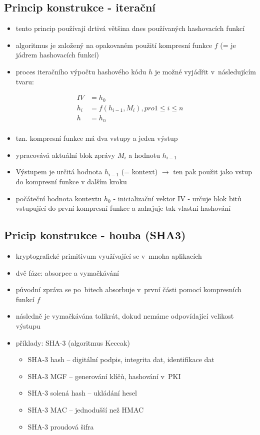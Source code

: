 \subsection{Princip konstrukce - iterační}
\begin{itemize}
    \item tento princip používají drtivá většina dnes používaných hashovacích funkcí
    \item algoritmus je založený na opakovaném použití kompresní funkce $f$ (= je jádrem hashovacích funkcí)
    \item proces iteračního výpočtu hashového kódu $h$ je možné vyjádřit v~následujícím tvaru:
\end{itemize}
\begin{align*}
    IV &= h_{0} \\
    h_{i} &= f (h_{i-1}, M_{i}), pro 1 \leq i \leq n \\
    h &= h_{n} \\
\end{align*}
\begin{itemize}
    \item tzn. kompresní funkce má dva vstupy a jeden výstup
    \item ypracovává aktuální blok zprávy $M_{i}$ a hodnotu $h_{i-1}$
    \item Výstupem je určitá hodnota $h_{i-1}$ (= kontext) $\longrightarrow$ ten pak použit jako vstup do kompresní funkce v dalším kroku
    \item počáteční hodnota kontextu $h_{0}$ - inicializační vektor IV - určuje blok bitů vstupující do první kompresní funkce a zahajuje tak vlastní hashování
\end{itemize}

\subsection{Pricip konstrukce - houba (SHA3)}
\begin{itemize}
    \item kryptografické primitivum využívající se v~mnoha aplikacích
    \item dvě fáze: absorpce a vymačkávání
    \item původní zpráva se po~bitech absorbuje v~první části pomocí kompresních funkcí $f$
    \item následně je vymačkávána tolikrát, dokud nemáme odpovídající velikost výstupu
    \item příklady: SHA-3 (algoritmus Keccak)
    \begin{itemize}
        \item SHA-3 hash -- digitální podpis, integrita dat, identifikace dat
        \item SHA-3 MGF -- generování klíčů, hashování v~PKI
        \item SHA-3 solená hash -- ukládání hesel
        \item SHA-3 MAC -- jednodušší než HMAC
        \item SHA-3 proudová šifra
    \end{itemize}
\end{itemize}


